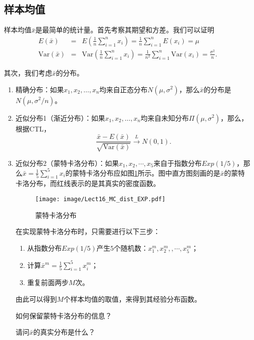\subsection{样本均值}
样本均值$\bar{x}$是最简单的统计量。首先考察其期望和方差。我们可以证明
\begin{eqnarray*}
    E(\bar{x}) &=& E\left( \frac{1}{n}\sum_{i=1}^{n} x_{i}  \right) = \frac{1}{n}\sum_{i=1}^{n} E(x_{i}) = \mu \\
    \text{Var}(\bar{x}) &=& \text{Var} \left( \frac{1}{n}\sum_{i=1}^{n} x_{i}  \right) = \frac{1}{n^2}\sum_{i=1}^{n} \text{Var}(x_{i})  = \frac{\sigma^2}{n}.
\end{eqnarray*}

其次，我们考虑$\bar{x}$的分布。
\begin{enumerate}
    \item 精确分布：如果$x_{1}, x_{2}, \ldots, x_{n}$均来自正态分布$N\left(\mu, \sigma^{2}\right) $，那么$\bar{x}$的分布是$N(\mu,\sigma^2/n)$。
    \item 近似分布1（渐近分布）：如果$x_{1}, x_{2}, \ldots, x_{n}$均来自未知分布$\Pi\left(\mu, \sigma^{2}\right) $，那么，根据CTL，
    $$
    \frac{\bar{x}-E(\bar{x})}{\sqrt{{\text{Var}}(\bar{x})}} \stackrel{L}{\longrightarrow} N(0,1).
    $$
    \item 近似分布2（蒙特卡洛分布）：如果$x_{1},x_{2},\cdots,x_{5}$来自于指数分布$Exp(1/5)$，那么$\bar{x} = \frac{1}{5}\sum_{i=1}^5x_i$的蒙特卡洛分布应如图\ref{fig:Lect16_MC_dist_EXP}所示。图中直方图刻画的是$\bar{x}$的蒙特卡洛分布，而红线表示的是其真实的密度函数。
\begin{figure}[ht]
    \centering
    \texttt{[image: image/Lect16\_MC\_dist\_EXP.pdf]}
    \caption{蒙特卡洛分布}
    \label{fig:Lect16_MC_dist_EXP}
\end{figure}

在实现蒙特卡洛分布时，只需要进行以下三步：
\begin{enumerate}
    \item 从指数分布$Exp(1/5)$产生$5$个随机数：$x_1^{m},x_2^{m},,\cdots,x_5^{m}$；
    \item 计算$\bar{x}^{m} = \frac{1}{5}\sum_{i=1}^5x_i^{m}；$
    \item 重复前面两步$M$次。
\end{enumerate}
由此可以得到$M$个样本均值的取值，来得到其经验分布函数。
\begin{problem}
    如何保留蒙特卡洛分布的信息？
\end{problem}

\begin{problem}
    请问$\bar{x}$的真实分布是什么？
\end{problem}
\end{enumerate}

